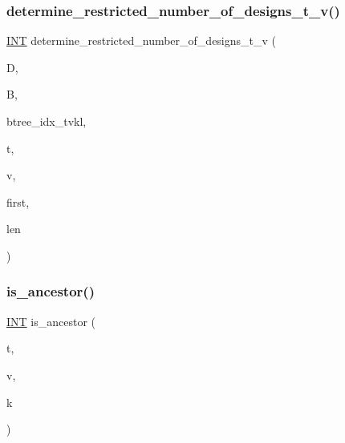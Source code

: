 \subsubsection{\texorpdfstring{determine\+\_\+restricted\+\_\+number\+\_\+of\+\_\+designs\+\_\+t\+\_\+v()}{determine\_restricted\_number\_of\_designs\_t\_v()}}
{\footnotesize\ttfamily \mbox{\hyperlink{galois_8h_a09fddde158a3a20bd2dcadb609de11dc}{I\+NT}} determine\+\_\+restricted\+\_\+number\+\_\+of\+\_\+designs\+\_\+t\+\_\+v (\begin{DoxyParamCaption}\item[{\mbox{\hyperlink{classdatabase}{database}} \&}]{D,  }\item[{\mbox{\hyperlink{classbtree}{btree}} \&}]{B,  }\item[{\mbox{\hyperlink{galois_8h_a09fddde158a3a20bd2dcadb609de11dc}{I\+NT}}}]{btree\+\_\+idx\+\_\+tvkl,  }\item[{\mbox{\hyperlink{galois_8h_a09fddde158a3a20bd2dcadb609de11dc}{I\+NT}}}]{t,  }\item[{\mbox{\hyperlink{galois_8h_a09fddde158a3a20bd2dcadb609de11dc}{I\+NT}}}]{v,  }\item[{\mbox{\hyperlink{galois_8h_a09fddde158a3a20bd2dcadb609de11dc}{I\+NT}}}]{first,  }\item[{\mbox{\hyperlink{galois_8h_a09fddde158a3a20bd2dcadb609de11dc}{I\+NT}}}]{len }\end{DoxyParamCaption})}

\mbox{\label{_l_i_b_2_d_i_s_c_r_e_t_a_2design_8_c_aa3e7989b3999eb0f31ce47006cb1f3b5}} 
\subsubsection{\texorpdfstring{is\+\_\+ancestor()}{is\_ancestor()}\hspace{0.1cm}{\footnotesize\ttfamily [1/2]}}
{\footnotesize\ttfamily \mbox{\hyperlink{galois_8h_a09fddde158a3a20bd2dcadb609de11dc}{I\+NT}} is\+\_\+ancestor (\begin{DoxyParamCaption}\item[{\mbox{\hyperlink{galois_8h_a09fddde158a3a20bd2dcadb609de11dc}{I\+NT}}}]{t,  }\item[{\mbox{\hyperlink{galois_8h_a09fddde158a3a20bd2dcadb609de11dc}{I\+NT}}}]{v,  }\item[{\mbox{\hyperlink{galois_8h_a09fddde158a3a20bd2dcadb609de11dc}{I\+NT}}}]{k }\end{DoxyParamCaption})}

